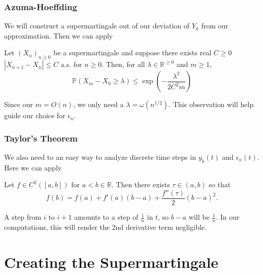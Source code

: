 \documentclass{beamer}
\begin{document}
\begin{frame}
  \frametitle{Azuma-Hoeffding}
  
  We will construct a supermartingale out of our deviation of \(Y_{k}\) from our approximation. Then we can apply
  \pause
  \begin{theorem}
    \label{azuma}
    Let \((X_{n})_{n \geq 0}\) be a supermartingale and suppose there exists real \(C \geq 0\) \(|X_{n+1} - X_{n}| \leq C\) a.s. for \(n \geq 0\). Then, for all \(\lambda \in \mathbb{R}^{\geq 0}\) and \(m \geq 1\),
    \[\mathbb{P}(X_{m} - X_{0} \geq  \lambda) \leq \exp\left(-\frac{\lambda^{2}}{2C^{2}m}\right)\]
  \end{theorem}
  \pause
  Since our \(m = O(n)\), we only need a \(\lambda = \omega(n^{1/2})\). This observation will help guide our choice for \(\epsilon_{n}\).
  
  
\end{frame}

\begin{frame}
  \frametitle{Taylor's Theorem}
  
  We also need to an easy way to analyze discrete time steps in \(y_{k}(t)\) and \(\epsilon_{n}(t)\). Here we can apply
  \pause
  \begin{theorem}
    \label{taylor}
    Let \(f \in C^{2}([a, b])\) for \(a < b \in \mathbb{R}\). Then there exists \(\tau \in (a, b)\) so that
    \[f(b) = f(a) + f'(a)(b-a) + \frac{f''(\tau)}{2}(b-a)^{2}.\]
  \end{theorem}
  \pause
  A step from \(i\) to \(i+1\) amounts to a step of \(\frac{1}{n}\) in \(t\), so \(b-a\) will be \(\frac{1}{n}\). In our computations, this will render the 2nd derivative term negligible.
  
  
\end{frame}

\section{Creating the Supermartingale}
\end{document}
